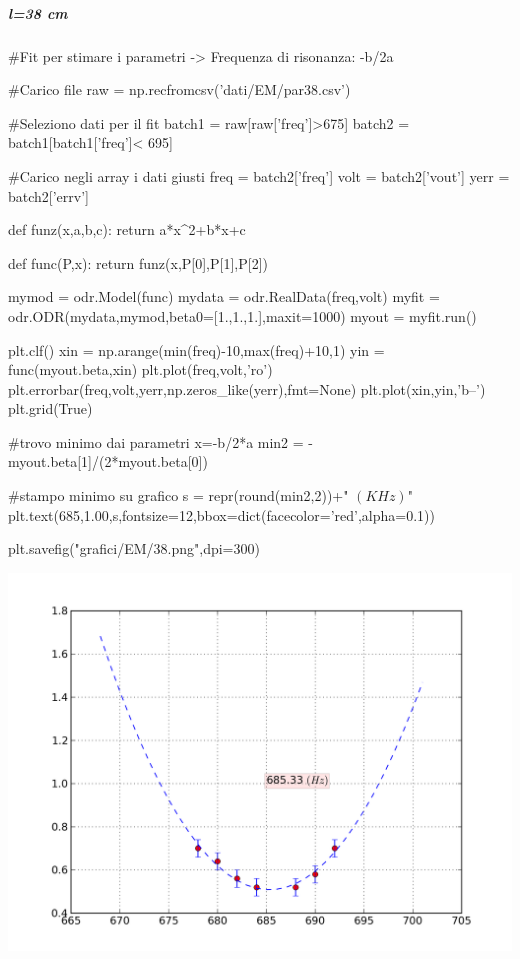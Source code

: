 \subparagraph*{l=38 cm}

\begin{sagesilent}
#Fit per stimare i parametri -> Frequenza di risonanza: -b/2a

#Carico file
raw = np.recfromcsv('dati/EM/par38.csv')

#Seleziono dati per il fit
batch1 = raw[raw['freq']>675]
batch2 = batch1[batch1['freq']< 695]

#Carico negli array i dati giusti
freq = batch2['freq']
volt = batch2['vout']
yerr = batch2['errv']


def funz(x,a,b,c):
    return a*x^2+b*x+c

def func(P,x):
    return funz(x,P[0],P[1],P[2])

mymod = odr.Model(func)
mydata = odr.RealData(freq,volt)
myfit = odr.ODR(mydata,mymod,beta0=[1.,1.,1.],maxit=1000)
myout = myfit.run()

plt.clf()
xin = np.arange(min(freq)-10,max(freq)+10,1)
yin = func(myout.beta,xin)
plt.plot(freq,volt,'ro')
plt.errorbar(freq,volt,yerr,np.zeros_like(yerr),fmt=None)
plt.plot(xin,yin,'b--')
plt.grid(True)

#trovo minimo dai parametri x=-b/2*a
min2 = -myout.beta[1]/(2*myout.beta[0]) 

#stampo minimo su grafico
s = repr(round(min2,2))+" $(KHz)$"
plt.text(685,1.00,s,fontsize=12,bbox=dict(facecolor='red',alpha=0.1))

plt.savefig("grafici/EM/38.png",dpi=300)

\end{sagesilent}

\includegraphics[scale=0.75]{grafici/EM/38.png}

